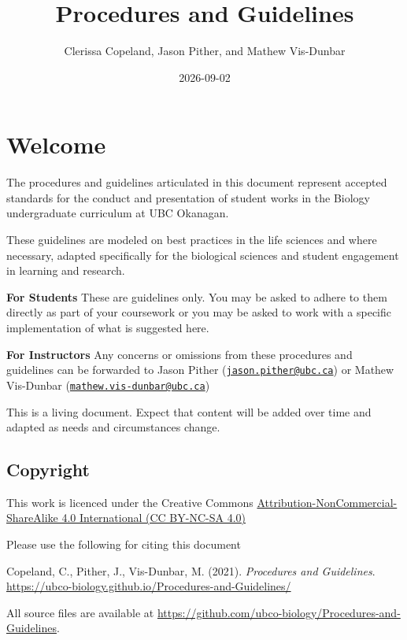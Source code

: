 \documentclass[
]{book}
\title{Procedures and Guidelines}
\author{Clerissa Copeland, Jason Pither, and Mathew Vis-Dunbar}
\date{2026-09-02}
\begin{document}
\maketitle

{
\setcounter{tocdepth}{1}
\tableofcontents
}
\chapter*{Welcome}\label{welcome}

The procedures and guidelines articulated in this document represent accepted standards for the conduct and presentation of student works in the Biology undergraduate curriculum at UBC Okanagan.

These guidelines are modeled on best practices in the life sciences and where necessary, adapted specifically for the biological sciences and student engagement in learning and research.

\textbf{For Students} These are guidelines only. You may be asked to adhere to them directly as part of your coursework or you may be asked to work with a specific implementation of what is suggested here.

\textbf{For Instructors} Any concerns or omissions from these procedures and guidelines can be forwarded to Jason Pither (\href{mailto:jason.pither@ubc.ca}{\nolinkurl{jason.pither@ubc.ca}}) or Mathew Vis-Dunbar (\href{mailto:mathew.vis-dunbar@ubc.ca}{\nolinkurl{mathew.vis-dunbar@ubc.ca}})

This is a living document. Expect that content will be added over time and adapted as needs and circumstances change.

\section*{Copyright}\label{copyright}

This work is licenced under the Creative Commons \href{https://creativecommons.org/licenses/by-nc-sa/4.0/}{Attribution-NonCommercial-ShareAlike 4.0 International (CC BY-NC-SA 4.0)}

Please use the following for citing this document

Copeland, C., Pither, J., Vis-Dunbar, M. (2021). \emph{Procedures and Guidelines}. \url{https://ubco-biology.github.io/Procedures-and-Guidelines/}

All source files are available at \url{https://github.com/ubco-biology/Procedures-and-Guidelines}.
\end{document}
